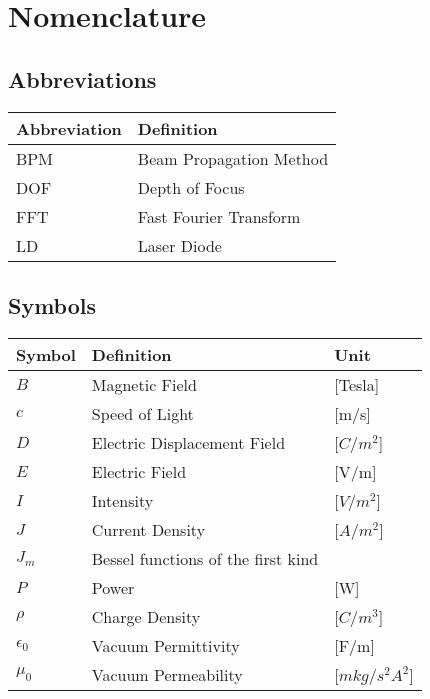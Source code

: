 \chapter*{Nomenclature}


\section*{Abbreviations}

\begin{longtable}{p{2.5cm}p{8cm}}
    \toprule
    Abbreviation & Definition \\
    \midrule\endhead %
    BPM & Beam Propagation Method \\
    DOF & Depth of Focus  \\
    FFT & Fast Fourier Transform\\
    LD & Laser Diode \\
    \bottomrule
\end{longtable}

\section*{Symbols}

\begin{longtable}{p{2.5cm}p{8cm}p{2.5cm}}
    \toprule
    Symbol & Definition & Unit \\
    \midrule\endhead %
    $B$ & Magnetic Field & [Tesla] \\
    $c$ & Speed of Light & [m/s] \\
    $D$ & Electric Displacement Field & [$C/m^2$] \\
    $E$ & Electric Field & [V/m] \\
    $I$ & Intensity & [$V/m^2$] \\
    $J$ & Current Density & [$A/m^2$] \\
    $J_m$ & Bessel functions of the first kind &  \\
    $P$ & Power & [W] \\
    \midrule %
    $\rho$ & Charge Density & [$C/m^3$] \\
    $\epsilon_0$ & Vacuum Permittivity & [F/m] \\
    $\mu_0$ & Vacuum Permeability & [$m kg / s^2 A^2$] \\
    \bottomrule
\end{longtable}